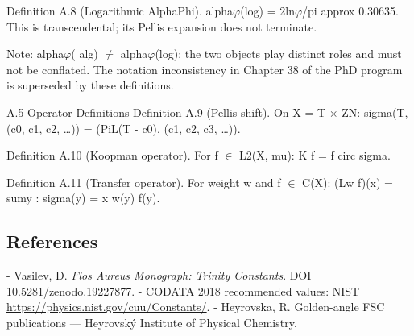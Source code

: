   Definition A.8 (Logarithmic AlphaPhi). alpha$\varphi$(log) = 2ln$\varphi$/pi approx 0.30635. This is
  transcendental; its Pellis expansion does not terminate.

  Note: alpha$\varphi$( alg) $\neq$ alpha$\varphi$(log); the two objects play distinct roles and must not be
  conflated. The notation inconsistency in Chapter 38 of the PhD program is superseded
  by these definitions.

  A.5 Operator Definitions
  Definition A.9 (Pellis shift). On X = T $\times$ ZN:
  sigma(T, (c0, c1, c2, …)) = (PiL(T - c0), (c1, c2, c3, …)).

  Definition A.10 (Koopman operator). For f $\in$ L2(X, mu): K f = f circ sigma.

  Definition A.11 (Transfer operator). For weight w and f $\in$ C(X): (Lw f)(x) = sumy :
  sigma(y) = x w(y) f(y).

\subsection{References}

- Vasilev, D. \textit{Flos Aureus Monograph: Trinity Constants}. DOI \href{https://zenodo.org/doi/10.5281/zenodo.19227877}{10.5281/zenodo.19227877}.
- CODATA 2018 recommended values: NIST \href{https://physics.nist.gov/cuu/Constants/}{https://physics.nist.gov/cuu/Constants/}.
- Heyrovska, R. Golden-angle FSC publications --- Heyrovský Institute of Physical Chemistry.
